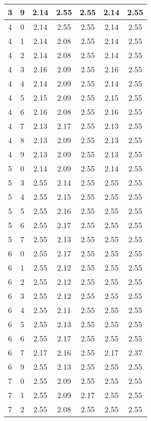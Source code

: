 \begin{longtable}{|c|c||c||c|c||c|c|}
	3 & 9 & 2.14 & 2.55 & 2.55 & 2.14 & 2.55 \\ \hline
	4 & 0 & 2.14 & 2.55 & 2.55 & 2.14 & 2.55 \\ \hline
	4 & 1 & 2.14 & 2.08 & 2.55 & 2.14 & 2.55 \\ \hline
	4 & 2 & 2.14 & 2.08 & 2.55 & 2.14 & 2.55 \\ \hline
	4 & 3 & 2.16 & 2.09 & 2.55 & 2.16 & 2.55 \\ \hline
	4 & 4 & 2.14 & 2.09 & 2.55 & 2.14 & 2.55 \\ \hline
	4 & 5 & 2.15 & 2.09 & 2.55 & 2.15 & 2.55 \\ \hline
	4 & 6 & 2.16 & 2.08 & 2.55 & 2.16 & 2.55 \\ \hline
	4 & 7 & 2.13 & 2.17 & 2.55 & 2.13 & 2.55 \\ \hline
	4 & 8 & 2.13 & 2.09 & 2.55 & 2.13 & 2.55 \\ \hline
	4 & 9 & 2.13 & 2.09 & 2.55 & 2.13 & 2.55 \\ \hline
	5 & 0 & 2.14 & 2.09 & 2.55 & 2.14 & 2.55 \\ \hline
	5 & 3 & 2.55 & 2.14 & 2.55 & 2.55 & 2.55 \\ \hline
	5 & 4 & 2.55 & 2.15 & 2.55 & 2.55 & 2.55 \\ \hline
	5 & 5 & 2.55 & 2.16 & 2.55 & 2.55 & 2.55 \\ \hline
	5 & 6 & 2.55 & 2.17 & 2.55 & 2.55 & 2.55 \\ \hline
	5 & 7 & 2.55 & 2.13 & 2.55 & 2.55 & 2.55 \\ \hline
	6 & 0 & 2.55 & 2.17 & 2.55 & 2.55 & 2.55 \\ \hline
	6 & 1 & 2.55 & 2.12 & 2.55 & 2.55 & 2.55 \\ \hline
	6 & 2 & 2.55 & 2.12 & 2.55 & 2.55 & 2.55 \\ \hline
	6 & 3 & 2.55 & 2.12 & 2.55 & 2.55 & 2.55 \\ \hline
	6 & 4 & 2.55 & 2.11 & 2.55 & 2.55 & 2.55 \\ \hline
	6 & 5 & 2.55 & 2.13 & 2.55 & 2.55 & 2.55 \\ \hline
	6 & 6 & 2.55 & 2.17 & 2.55 & 2.55 & 2.55 \\ \hline
	6 & 7 & 2.17 & 2.16 & 2.55 & 2.17 & 2.37 \\ \hline
	6 & 9 & 2.55 & 2.13 & 2.55 & 2.55 & 2.55 \\ \hline
	7 & 0 & 2.55 & 2.09 & 2.55 & 2.55 & 2.55 \\ \hline
	7 & 1 & 2.55 & 2.09 & 2.17 & 2.55 & 2.55 \\ \hline
	7 & 2 & 2.55 & 2.08 & 2.55 & 2.55 & 2.55 \\ \hline

\end{longtable}
